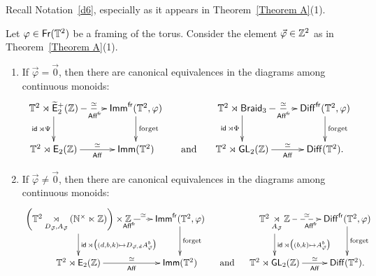 Recall Notation~\ref{d6}, especially as it appears in Theorem~\ref{Theorem A}(1).
\begin{lemma}
\label{t34}
Let $\varphi\in \operatorname{\sf Fr}(\mathbb T^2)$ be a framing of the torus.
Consider the element $\vec{\varphi} \in \mathbb Z^2$ as in Theorem~\ref{Theorem A}(1).
\begin{enumerate}

\item
If $\vec{\varphi} = \vec{0}$, then there are canonical equivalences in the diagrams among continuous monoids:
\begin{equation}
\label{e54}
\xymatrix@C=1em{
\TT^2 \rtimes \Ebraid
\ar@{-->}[rr]^-{\simeq}_{\Aff^{\fr}}
\ar[d]_-{\id \rtimes \Psi}
&&
\Imm^{\fr}(\TT^2,\varphi) 
\ar[d]^-{\rm forget}
&&
\TT^2 \rtimes \Braid 
\ar@{-->}[rr]^-{\simeq}_{\Aff^{\fr}}
\ar[d]_-{\id \rtimes \Phi}
&&
\Diff^{\fr}(\TT^2,\varphi) 
\ar[d]^-{\rm forget}
\\
\TT^2 \rtimes \EZ
\ar[rr]^-{\simeq}_-\Aff
&&
\Imm(\TT^2)
&
\text{ and }
&
\TT^2 \rtimes  \GL_2(\ZZ)
\ar[rr]^-{\simeq}_-\Aff
&&
\Diff(\TT^2)
.
}
\end{equation}



\item
If $\vec{\varphi} \neq \vec{0}$, then there are canonical equivalences in the diagrams among continuous monoids:
\begin{equation}
\xymatrix@C=.7em{
\left( \TT^2 \underset{D_{\vec{\varphi}} , A_{\vec{\varphi}}} \rtimes (\NN^\times \ltimes \ZZ ) \right) \times \ZZ
\ar@{-->}[rr]^-{\simeq}_{\Aff^{\fr}}
\ar[d]^-{\id \rtimes \bigl( (d,b,k)\mapsto D_{\vec{\varphi},d} A_{\vec{\varphi}}^b \bigr)}
&&
\Imm^{\fr}(\TT^2,\varphi) 
\ar[d]^-{\rm forget}
&&
\TT^2 \underset{A_{\vec{\varphi}}} \rtimes \ZZ
\ar@{-->}[rr]^-{\simeq}_{\Aff^{\fr}}
\ar[d]^-{\id \rtimes \bigl( (b,k)\mapsto A_{\vec{\varphi}}^b \bigr)}
&&
\Diff^{\fr}(\TT^2,\varphi) 
\ar[d]^-{\rm forget}
\\
\TT^2 \rtimes \EZ
\ar[rr]^-{\simeq}_-\Aff
&&
\Imm(\TT^2)
&
\text{ and }
&
\TT^2 \rtimes  \GL_2(\ZZ)
\ar[rr]^-{\simeq}_-\Aff
&&
\Diff(\TT^2)
.
}
\end{equation}




\end{enumerate}


\end{lemma}



